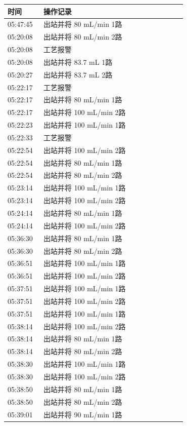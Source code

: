 \documentclass[UTF8,10pt,a4paper,fontset=fandol]{ctexart}
\begin{document}
\vspace{1em}

\begin{tabular}{p{0.18\linewidth}p{0.72\linewidth}}
\textbf{时间} & \textbf{操作记录}\\ \hline
05:47:45 & 出站并将 80 mL/min 1路\\
05:20:08 & 出站并将 80 mL/min 2路\\
05:20:08 & 工艺报警\\
05:20:08 & 出站并将 83.7 mL 1路\\
05:20:27 & 出站并将 83.7 mL 2路\\
05:22:17 & 工艺报警\\
05:22:17 & 出站并将 80 mL/min 1路\\
05:22:17 & 出站并将 100 mL/min 2路\\
05:22:23 & 出站并将 100 mL/min 1路\\
05:22:33 & 工艺报警\\
05:22:54 & 出站并将 100 mL/min 2路\\
05:22:54 & 出站并将 80 mL/min 1路\\
05:22:54 & 出站并将 80 mL/min 2路\\
05:23:14 & 出站并将 100 mL/min 1路\\
05:23:14 & 出站并将 100 mL/min 2路\\
05:24:14 & 出站并将 80 mL/min 1路\\
05:24:14 & 出站并将 100 mL/min 2路\\
05:36:30 & 出站并将 80 mL/min 1路\\
05:36:30 & 出站并将 80 mL/min 2路\\
05:36:51 & 出站并将 100 mL/min 1路\\
05:36:51 & 出站并将 100 mL/min 2路\\
05:37:51 & 出站并将 100 mL/min 1路\\
05:37:51 & 出站并将 100 mL/min 2路\\
05:37:51 & 出站并将 100 mL/min 1路\\
05:38:14 & 出站并将 100 mL/min 2路\\
05:38:14 & 出站并将 80 mL/min 1路\\
05:38:14 & 出站并将 80 mL/min 2路\\
05:38:30 & 出站并将 100 mL/min 1路\\
05:38:30 & 出站并将 100 mL/min 2路\\
05:38:50 & 出站并将 80 mL/min 1路\\
05:38:50 & 出站并将 80 mL/min 2路\\
05:39:01 & 出站并将 90 mL/min 1路\\

\end{tabular}
\end{document}
